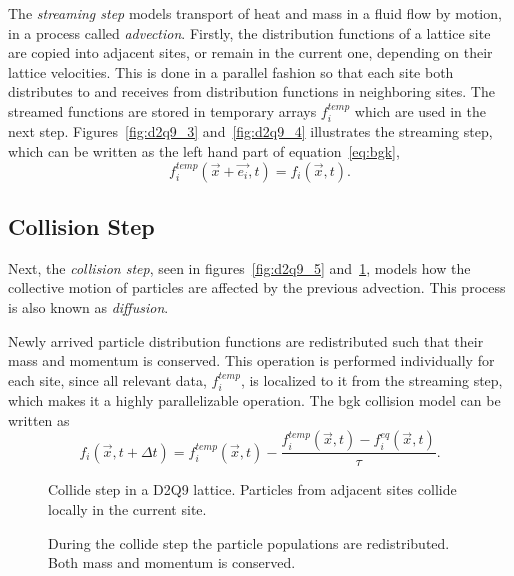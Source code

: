 The \textit{streaming step} models transport of heat and mass in a fluid flow by motion, in a process called \textit{advection}. Firstly, the distribution functions of a lattice site are copied into adjacent sites, or remain in the current one, depending on their lattice velocities. This is done in a parallel fashion so that each site both distributes to and receives from distribution functions in neighboring sites. The streamed functions are stored in temporary arrays $f_i^{temp}$ which are used in the next step. Figures~\ref{fig:d2q9_3} and~\ref{fig:d2q9_4} illustrates the streaming step, which can be written as the left hand part of equation~\ref{eq:bgk},
\begin{equation}
f_i^{temp}(\vec{x} + \vec{e_i},t) = f_i (\vec{x}, t).
\end{equation}

\subsection{Collision Step}
Next, the \textit{collision step}, seen in figures~\ref{fig:d2q9_5} and~\ref{fig:d2q9_6}, models how the collective motion of particles are affected by the previous advection. This process is also known as \textit{diffusion}.

Newly arrived particle distribution functions are redistributed such that their mass and momentum is conserved. This operation is performed individually for each site, since all relevant data, $f_i^{temp}$, is localized to it from the streaming step, which makes it a highly parallelizable operation. The \gls{bgk} collision model can be written as~\cites[pg.60]{Delbosc}
\begin{equation}
f_i(\vec{x}, t+\Delta t) = f_i^{temp}(\vec{x},t) - \frac{f_i^{temp}(\vec{x},t)-f_i^{eq}(\vec{x},t)}{\tau}.
\end{equation}

\begin{figure}[!htb]
\centering
\begin{minipage}[t]{.45\textwidth}
	\centering
	\begin{small}
	\def\svgwidth{0.9\linewidth}
	
	\end{small}
	\caption{Collide step in a D2Q9 lattice. Particles from adjacent sites collide locally in the current site.}
	\label{fig:d2q9_5}
\end{minipage}\qquad%
\begin{minipage}[t]{.45\textwidth}
	\centering
	\begin{small}
	\def\svgwidth{0.9\linewidth}
	
	\end{small}
	\caption{During the collide step the particle populations are redistributed. Both mass and momentum is conserved.}
	\label{fig:d2q9_6}
\end{minipage}
\end{figure}

